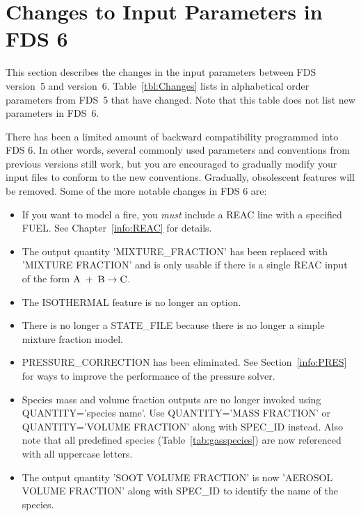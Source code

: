 \documentclass[11pt]{book}
\begin{document}
\section{Changes to Input Parameters in FDS 6}

This section describes the changes in the input parameters between FDS version~5 and version~6. Table~\ref{tbl:Changes} lists in alphabetical order parameters from
FDS~5 that have changed. Note that this table does not list new parameters in FDS~6.

There has been a limited amount of backward compatibility programmed into FDS 6. In other words, several commonly used parameters and conventions from previous versions still
work, but you are encouraged to gradually modify your input files to conform to the new conventions. Gradually, obsolescent features will be removed. Some of the more notable changes
in FDS 6 are:
\begin{itemize}
\item If you want to model a fire, you {\em must} include a {\ct REAC} line with a specified {\ct FUEL}. See Chapter~\ref{info:REAC} for details.
\item The output quantity {\ct 'MIXTURE\_FRACTION'} has been replaced with {\ct 'MIXTURE FRACTION'} and is only usable if there is a single {\ct REAC} input of the form ${\rm A} \; + \; {\rm B} \rightarrow {\rm C}$.
\item The {\ct ISOTHERMAL} feature is no longer an option.
\item There is no longer a {\ct STATE\_FILE} because there is no longer a simple mixture fraction model.
\item {\ct PRESSURE\_CORRECTION} has been eliminated. See Section~\ref{info:PRES} for ways to improve the performance of the pressure solver.
\item Species mass and volume fraction outputs are no longer invoked using {\ct QUANTITY='species name'}. Use {\ct QUANTITY='MASS FRACTION'} or {\ct QUANTITY='VOLUME FRACTION'} along with
{\ct SPEC\_ID} instead.  Also note that all predefined species (Table~\ref{tab:gasspecies}) are now referenced with all uppercase letters.
\item The output quantity {\ct 'SOOT VOLUME FRACTION'} is now {\ct 'AEROSOL VOLUME FRACTION'} along with {\ct SPEC\_ID} to identify the name of the species.
\end{itemize}
\end{document}
